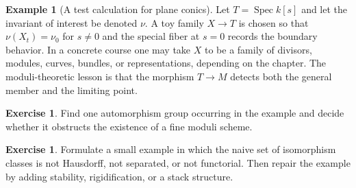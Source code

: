 \documentclass[11pt]{amsart}
\theoremstyle{definition}
\newtheorem{example}[theorem]{Example}
\newtheorem{exercise}[theorem]{Exercise}
\newcommand{\Spec}{\operatorname{Spec}}
\begin{document}
\begin{example}[A test calculation for plane conics]
Let $T=\Spec k[s]$ and let the invariant of interest be denoted $\nu$.  A toy family $X\to T$ is chosen so that $\nu(X_t)=\nu_0$ for $s\ne0$ and the special fiber at $s=0$ records the boundary behavior.  In a concrete course one may take $X$ to be a family of divisors, modules, curves, bundles, or representations, depending on the chapter.  The moduli-theoretic lesson is that the morphism $T\to M$ detects both the general member and the limiting point.
\end{example}
\begin{exercise}
Find one automorphism group occurring in the example and decide whether it obstructs the existence of a fine moduli scheme.
\end{exercise}
\begin{exercise}
Formulate a small example in which the naive set of isomorphism classes is not Hausdorff, not separated, or not functorial.  Then repair the example by adding stability, rigidification, or a stack structure.
\end{exercise}
\clearpage
\end{document}
